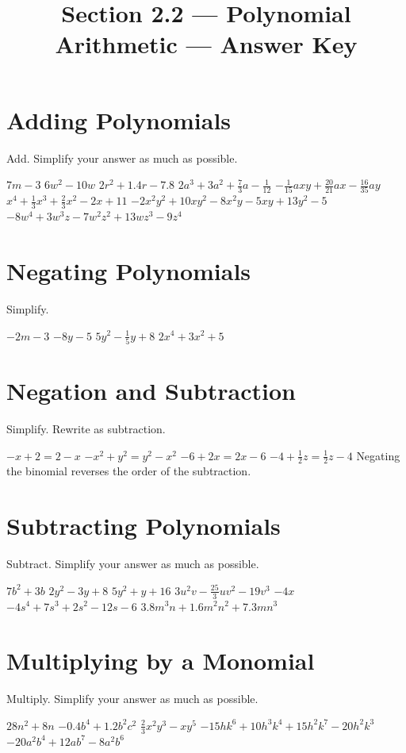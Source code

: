 

\title{Section 2.2 --- Polynomial Arithmetic --- Answer Key}


\maketitle

\section*{Adding Polynomials}
Add.  Simplify your answer as much as possible.
\begin{smenum}
\mitemxx
{$7m-3$}
{$6w^2-10w$}
\mitemxx
{$2r^2+1.4r-7.8$}
{$2a^3+3a^2+\frac{7}{3}a-\frac{1}{12}$}
\mitemxx
{$-\frac{1}{15}axy+\frac{20}{21}ax-\frac{16}{35}ay$}
{$x^4+\frac{1}{3}x^3+\frac{2}{3}x^2-2x+11$}
\mitemxx
{$-2x^2y^2+10xy^2-8x^2y-5xy+13y^2-5$}
{$-8w^4+3w^3z-7w^2z^2+13wz^3-9z^4$}
\end{smenum}

\section*{Negating Polynomials}
Simplify.
\begin{smenum}
\mitemxxxx
{$-2m-3$}
{$-8y-5$}
{$5y^2-\frac{1}{5}y+8$}
{$2x^4+3x^2+5$}
\end{smenum}

\section*{Negation and Subtraction}
Simplify.  Rewrite as subtraction.
\begin{smenum}
\mitemxxxx
{$-x+2=2-x$}
{$-x^2+y^2=y^2-x^2$}
{$-6+2x=2x-6$}
{$-4+\frac{1}{2}z=\frac{1}{2}z-4$}
\mitemx
{Negating the binomial reverses the order of the subtraction.}
\end{smenum}

\section*{Subtracting Polynomials}
Subtract.  Simplify your answer as much as possible.
\begin{smenum}
\mitemxx
{$7b^2+3b$}
{$2y^2-3y+8$}
\mitemxx
{$5y^2+y+16$}
{$3u^2v-\frac{25}{3}uv^2-19v^3$}
\mitemxx
{$-4x$}
{$-4s^4+7s^3+2s^2-12s-6$}
\mitemx
{$3.8m^3n+1.6m^2n^2+7.3mn^3$}
\end{smenum}

\section*{Multiplying by a Monomial}
Multiply.  Simplify your answer as much as possible.
\begin{smenum}
\mitemxxx
{$28n^2+8n$}
{$-0.4b^4+1.2b^2c^2$}
{$\frac{2}{3}x^2y^3-xy^5$}
\mitemxx
{$-15hk^6+10h^3k^4+15h^2k^7-20h^2k^3$}
{$-20a^2b^4+12ab^7-8a^2b^6$}
\end{smenum}

